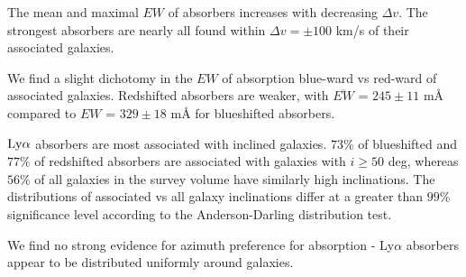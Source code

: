 \documentclass[iop]{emulateapj-rtx4}
\begin{document}
\indent \textbullet \indent The mean and maximal $EW$ of absorbers increases with decreasing $\Delta v$. The strongest absorbers are nearly all found within $\Delta v = \pm 100$ km/s of their associated galaxies.

\indent \textbullet \indent We find a slight dichotomy in the $EW$ of absorption blue-ward vs red-ward of associated galaxies. Redshifted absorbers are weaker, with $\overline{EW}$ = $245 \pm 11$ $\textrm{m\AA}$ compared to $EW$ = $329 \pm 18$ $\textrm{m\AA}$ for blueshifted absorbers.


\textbullet \indent $\rm Ly\alpha$ absorbers are most associated with inclined galaxies. $73\%$ of blueshifted and $77\%$ of redshifted absorbers are associated with galaxies with $i \geq 50$ deg, whereas $56\%$ of all galaxies in the survey volume have similarly high inclinations. The distributions of associated vs all galaxy inclinations differ at a greater than $99\%$ significance level according to the Anderson-Darling distribution test.

\indent \textbullet \indent We find no strong evidence for azimuth preference for absorption - Ly$\alpha$ absorbers appear to be distributed uniformly around galaxies.


\nocite{*}


\end{document}
